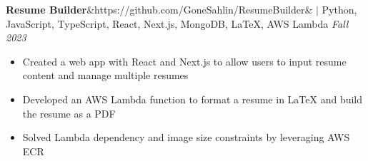 \documentclass[11pt, a4paper, roman]{moderncv}
\newcommand{\project}[5]{
	\textbf{#1}\ifx&#2&{}
	\else
    		\href{#2}{\:\small\faGithub\:}\fi$|$ #3
	\hfill\textit{#4}
	#5
	\vspace{2mm}
}
\begin{document}

{\project{Resume Builder}{https://github.com/GoneSahlin/ResumeBuilder}{Python, JavaScript, TypeScript, React, Next.js, MongoDB, LaTeX, AWS Lambda}{Fall 2023}
	{\begin{itemize}
		\item Created a web app with React and Next.js to allow users to input resume content and manage multiple resumes
		\item Developed an AWS Lambda function to format a resume in LaTeX and build the resume as a PDF
		\item Solved Lambda dependency and image size constraints by leveraging AWS ECR
	\end{itemize}}
}





\end{document}
